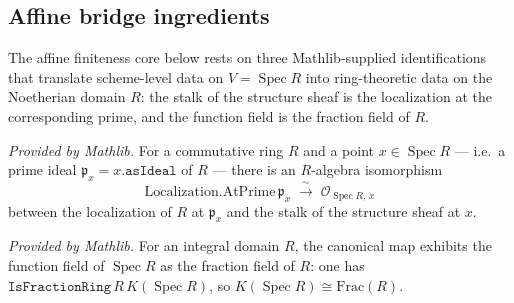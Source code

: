 \subsection{Affine bridge ingredients}
\label{subsec:affine_bridge_ingredients}
The affine finiteness core below rests on three Mathlib-supplied identifications
that translate scheme-level data on \(V = \operatorname{Spec} R\) into
ring-theoretic data on the Noetherian domain \(R\): the stalk of the structure
sheaf is the localization at the corresponding prime, and the function field is
the fraction field of \(R\).

\begin{lemma}
  \label{lem:structureSheaf_stalkIso}
  \mathlibok
  \textit{Provided by Mathlib.}
  For a commutative ring \(R\) and a point \(x \in \operatorname{Spec} R\) --- i.e.\ a
  prime ideal \(\mathfrak p_x = x.\mathtt{asIdeal}\) of \(R\) --- there is an
  \(R\)-algebra isomorphism
  \[
    \mathrm{Localization.AtPrime}\,\mathfrak p_x
    \;\xrightarrow{\ \sim\ }\;
    \mathcal O_{\operatorname{Spec} R,\,x}
  \]
  between the localization of \(R\) at \(\mathfrak p_x\) and the stalk of the
  structure sheaf at \(x\).
\end{lemma}

\begin{lemma}
  \label{lem:functionField_isFractionRing_of_affine}
  \mathlibok
  \textit{Provided by Mathlib.}
  For an integral domain \(R\), the canonical map exhibits the function field of
  \(\operatorname{Spec} R\) as the fraction field of \(R\): one has
  \(\mathtt{IsFractionRing}\,R\,K(\operatorname{Spec} R)\), so
  \(K(\operatorname{Spec} R) \cong \mathrm{Frac}(R)\).
\end{lemma}

